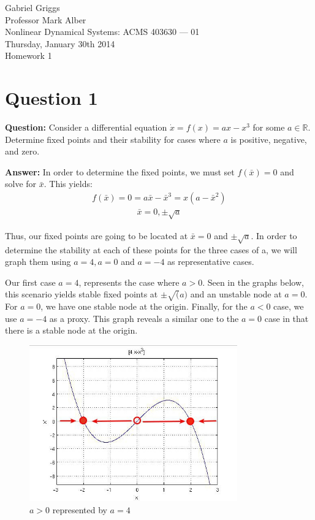 \documentclass[12pt]{article}
\newenvironment{myenv}{\begin{adjustwidth}{1cm}{}}{\end{adjustwidth}}
\begin{document}
{\raggedleft{}Gabriel Griggs} \\
Professor Mark Alber \\
Nonlinear Dynamical Systems: ACMS 403630 --- 01 \\
Thursday, January 30th 2014\\
Homework 1
\section*{Question 1}
\begin{myenv}
\textbf{Question:} Consider a differential equation $ \dot{x} = f(x) = ax - x^3$ for some $a \in \mathbb{R}$. Determine fixed points and their stability for cases where $a$ is positive, negative, and zero.

\textbf{Answer:} In order to determine the fixed points, we must set $ f(\bar{x}) = 0 $ and solve for $ \bar{x} $. This yields:
\begin{align*}
f(\bar{x}) = 0 = a\bar{x}-\bar{x}^3 = x(a-\bar{x}^2)
\end{align*}
\begin{align*}
\bar{x} = 0, \pm\sqrt{a}
\end{align*}

Thus, our fixed points are going to be located at $\bar{x} = 0$ and $\pm\sqrt{a}$. In order to determine the stability at each of these points for the three cases of a, we will graph them using $a = 4, a = 0$ and $a = -4$ as representative cases.

Our first case $ a = 4 $, represents the case where $ a > 0 $. Seen in the graphs below, this scenario yields stable fixed points at $ \pm\sqrt(a) $ and an unstable node at $a = 0$. For $a = 0$, we have one stable node at the origin. Finally, for the $ a < 0 $ case, we use $ a = -4 $ as a proxy. This graph reveals a similar one to the $ a = 0 $ case in that there is a stable node at the origin.

\begin{figure} [H]
    \centering
    \includegraphics[width=0.8\textwidth]{a41}
    \caption{$ a > 0$ represented by $ a = 4 $}
    \label{figure:a1}
\end{figure}


\end{myenv}
\end{document}
